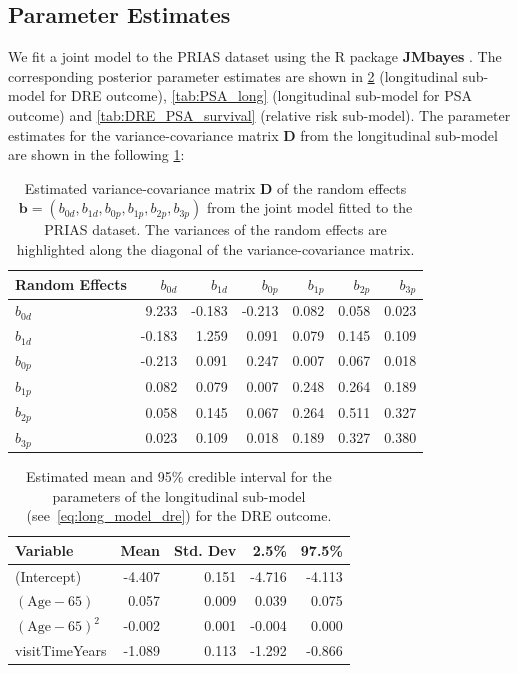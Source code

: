 \subsection{Parameter Estimates}
We fit a joint model to the PRIAS dataset using the R package \textbf{JMbayes} \citep{rizopoulosJMbayes}. The corresponding posterior parameter estimates are shown in \ref{tab:DRE_long} (longitudinal sub-model for DRE outcome), \ref{tab:PSA_long} (longitudinal sub-model for PSA outcome) and \ref{tab:DRE_PSA_survival} (relative risk sub-model). The parameter estimates for the variance-covariance matrix $\boldsymbol{D}$ from the longitudinal sub-model are shown in the following \ref{tab:D_matrix}:
\begin{table}[!htb]
\begin{center}
\caption{Estimated variance-covariance matrix $\boldsymbol{D}$ of the random effects ${\boldsymbol{b}=(b_{0d},b_{1d},b_{0p}, b_{1p}, b_{2p}, b_{3p})}$ from the joint model fitted to the PRIAS dataset. The variances of the random effects are highlighted along the diagonal of the variance-covariance matrix.}
\label{tab:D_matrix}
\begin{tabular}{lrrrrrr}
\hline
\hline
Random Effects    & $b_{0d}$    & $b_{1d}$    & $b_{0p}$    & $b_{1p}$   & $b_{2p}$   & $b_{3p}$ \\
\hline
$b_{0d}$ & 9.233 & -0.183 & -0.213 & 0.082 & 0.058 & 0.023 \\
$b_{1d}$ & -0.183 & 1.259 & 0.091 & 0.079 & 0.145 & 0.109 \\
\hline
$b_{0p}$ & -0.213 & 0.091 & 0.247 & 0.007 & 0.067 & 0.018 \\
$b_{1p}$ & 0.082 & 0.079 & 0.007 & 0.248 & 0.264 & 0.189 \\
$b_{2p}$ & 0.058 & 0.145 & 0.067 & 0.264 & 0.511 & 0.327 \\
$b_{3p}$ & 0.023 & 0.109 & 0.018 & 0.189 & 0.327 & 0.380 \\
\hline
\end{tabular}
\end{center}
\end{table}

\begin{table}[!htb]
\begin{center}
\caption{Estimated mean and 95\% credible interval for the parameters of the longitudinal sub-model (see~\ref{eq:long_model_dre}) for the DRE outcome.}
\label{tab:DRE_long}
\begin{tabular}{lrrrr}
\hline
\hline
Variable                         & Mean & Std. Dev & 2.5\%  & 97.5\%   \\
\hline
(Intercept)                      & -4.407 & 0.151 & -4.716 & -4.113 \\
$(\mbox{Age} - 65)$              & 0.057 & 0.009 & 0.039 & 0.075 \\
$(\mbox{Age} - 65)^2$            & -0.002 & 0.001 & -0.004 & 0.000\\
visitTimeYears                   & -1.089 & 0.113 & -1.292 & -0.866 \\
\hline
\end{tabular}
\end{center}
\end{table}


